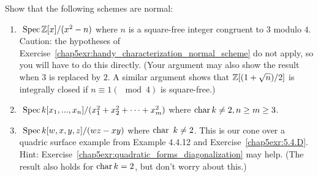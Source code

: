 \documentclass[11pt]{book} %
\begin{document}
\begin{exr}\label{chap5exr:normal_schemes_examples}
Show that the following schemes are normal:
\begin{enumerate}[label=(\alph*)]
\item  $\text{ Spec\,}\mathbb Z[x]/(x^2-n)$ where $n$ is a square-free integer congruent to $3$ modulo $4$. Caution: the hypotheses of Exercise~\ref{chap5exr:handy_characterization_normal_scheme} do not apply, so you will have to do this directly. (Your argument may also show the result when $3$ is replaced by $2$. A similar argument shows that $\mathbb Z[(1+\sqrt{n})/2]$ is integrally closed if $n \equiv 1 (\mod 4)$ is square-free.)
\item
 $\text{ Spec\,} k[x_1,...,x_n]/(x^2_1+x_2^2+\cdots+x^2_m)$ where $\text{char\,} k\neq 2, n\geq m\geq 3$.
\item $\text{ Spec\,} k[w, x, y, z]/(wz - xy)$ where $\text{char\,}\ k\neq  2$. This is our cone over a quadric surface example from Example 4.4.12 and Exercise~\ref{chap5exr:5.4.D}. Hint: Exercise~\ref{chap5exr:quadratic_forms_diagonalization} may help. (The result also holds for $\text{char\,} k = 2$, but don’t worry about this.)
\end{enumerate}
\end{exr}
\end{document}
